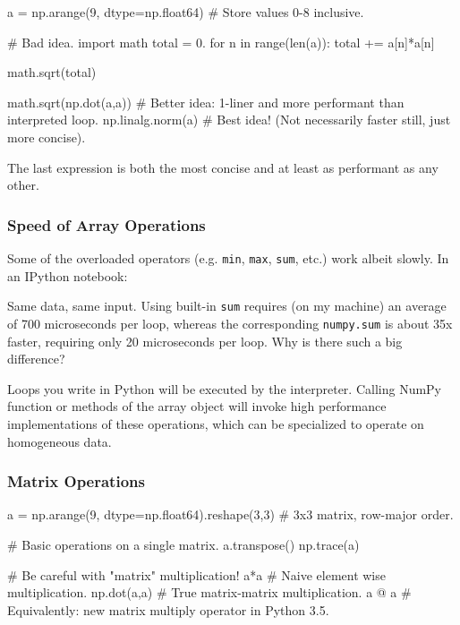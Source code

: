 \documentclass[12pt,letterpaper,twoside]{article}
\begin{document}
\begin{python}
a = np.arange(9, dtype=np.float64)   # Store values 0-8 inclusive.

# Bad idea.
import math
total = 0.
for n in range(len(a)):
    total += a[n]*a[n]

math.sqrt(total)

math.sqrt(np.dot(a,a))  # Better idea: 1-liner and more performant than interpreted loop.
np.linalg.norm(a)       # Best idea! (Not necessarily faster still, just more concise).
\end{python}

The last expression is both the most concise and at least as
performant as any other.

\subsubsection{Speed of Array Operations}

Some of the overloaded operators (e.g. \texttt{min}, \texttt{max},
\texttt{sum}, etc.) work albeit slowly.
In an IPython notebook:
\begin{python}
\end{python}

Same data, same input. Using built-in \texttt{sum} requires (on my
machine) an average of 700 microseconds per loop, whereas the
corresponding \texttt{numpy.sum} is about 35x faster, requiring only
20 microseconds per loop. Why is there such a big difference?

Loops you write in Python will be executed by the interpreter.
Calling NumPy function or methods of the array object will invoke high
performance implementations of these operations, which can be
specialized to operate on homogeneous data.

\subsubsection{Matrix Operations}

\begin{python}
a = np.arange(9, dtype=np.float64).reshape(3,3)  # 3x3 matrix, row-major order.

# Basic operations on a single matrix.
a.transpose()
np.trace(a)

# Be careful with "matrix" multiplication!
a*a           # Naive element wise multiplication.
np.dot(a,a)   # True matrix-matrix multiplication.
a @ a         # Equivalently: new matrix multiply operator in Python 3.5.
\end{python}
\end{document}
